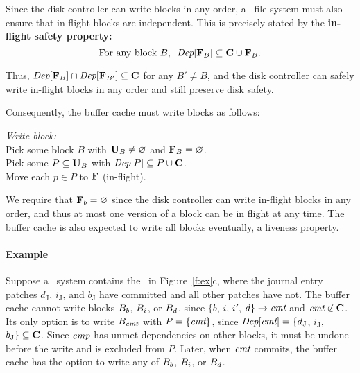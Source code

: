 Since the disk controller can write blocks in any order, a \Kudos\ file
 system must also ensure
that in-flight blocks are independent.  This is precisely stated
by the \textbf{in-flight safety property:}
%
\[ \text{For any block $B$,~~} \PDepset{\PInf[B]} \subseteq \PDisk \cup \PInf[B] . \]
%
\begin{comment}
(The union with $\PInf[B]$ is necessary for the case of multiple in-flight
\patches\ on the same block.)
\end{comment}
%
Thus, $\PDepset{\PInf[B]} \cap \PDepset{\PInf[B']} \subseteq \PDisk$ for
 any $B' \neq B$, and the disk controller can safely write in-flight blocks
 in any order and still preserve disk safety.


Consequently, the buffer cache must write blocks as follows:

\begin{tabbing}
\quad \textit{Write block:} \\
\quad \quad Pick some block $B$ with $\PMem[B] \neq \emptyset$ and $\PInf[B] =
\emptyset$. \\
\quad \quad Pick some $P \subseteq \PMem[B]$ with $\PDepset{P} \subseteq P \cup
\PDisk$. \\
\quad \quad Move each $p \in P$ to $\PInf$ (in-flight).
\end{tabbing}

\noindent
%
We require that $\PInf[b] = \emptyset$ since the disk controller can write
in-flight blocks in any order, and thus at most one version of a block can
be in flight at any time.
%
The buffer cache is also expected to write all blocks eventually, a
 liveness property.

\paragraph{Example}
%
Suppose a \Kudos\ system contains the \patches\ in Figure~\ref{f:ex}c,
where the journal entry patches $d_\textrm{J}$, $i_\textrm{J}$, and
 $b_\textrm{J}$ have committed and all other patches have not.
%
The buffer cache cannot write blocks $B_{b}$, $B_{i}$, or $B_{d}$,
since $\{b$, $i$, $i'$, $d\} \rightarrow \textit{cmt}$ and $\PXcmt \not\in \PDisk$.
%
Its only option is to write $B_{\textit{cmt}}$ with $P = \{\textit{cmt}\}$, since
 $\textit{Dep}[\textit{cmt}] = \{d_\textrm{J}$, $i_\textrm{J}$, $b_\textrm{J}\}
 \subseteq \PDisk$.
%
Since $\textit{cmp}$ has unmet dependencies on other blocks, it must be undone
 before the write and is excluded from $P$.
%
Later, when $\textit{cmt}$ commits, the buffer cache has the option to
write any of $B_{b}$, $B_{i}$, or $B_{d}$.



